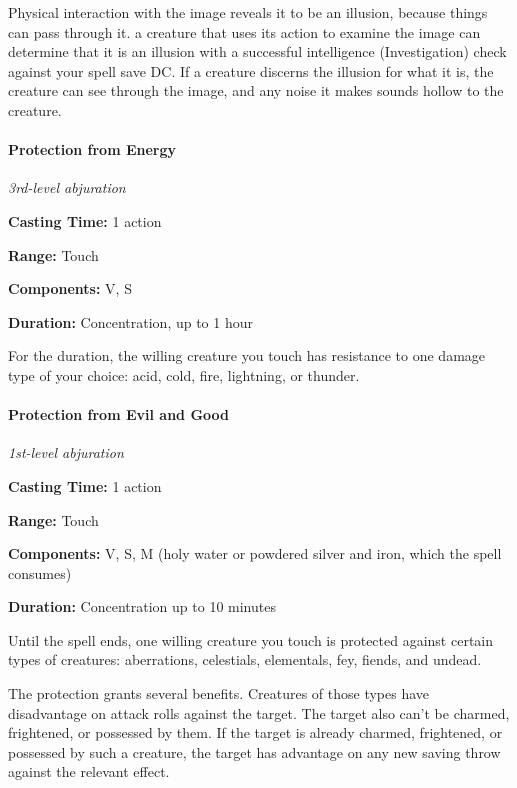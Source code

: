 \documentclass[
]{article}
\begin{document}
Physical interaction with the image reveals it to be an illusion,
because things can pass through it. a creature that uses its action to
examine the image can determine that it is an illusion with a successful
intelligence (Investigation) check against your spell save DC. If a
creature discerns the illusion for what it is, the creature can see
through the image, and any noise it makes sounds hollow to the creature.

\hypertarget{protection-from-energy}{%
\paragraph{Protection from Energy}\label{protection-from-energy}}

\emph{3rd-level abjuration}

\textbf{Casting Time:} 1 action

\textbf{Range:} Touch

\textbf{Components:} V, S

\textbf{Duration:} Concentration, up to 1 hour

For the duration, the willing creature you touch has resistance to one
damage type of your choice: acid, cold, fire, lightning, or thunder.

\hypertarget{protection-from-evil-and-good}{%
\paragraph{Protection from Evil and
Good}\label{protection-from-evil-and-good}}

\emph{1st-level abjuration}

\textbf{Casting Time:} 1 action

\textbf{Range:} Touch

\textbf{Components:} V, S, M (holy water or powdered silver and iron,
which the spell consumes)

\textbf{Duration:} Concentration up to 10 minutes

Until the spell ends, one willing creature you touch is protected
against certain types of creatures: aberrations, celestials, elementals,
fey, fiends, and undead.

The protection grants several benefits. Creatures of those types have
disadvantage on attack rolls against the target. The target also can't
be charmed, frightened, or possessed by them. If the target is already
charmed, frightened, or possessed by such a creature, the target has
advantage on any new saving throw against the relevant effect.
\end{document}
